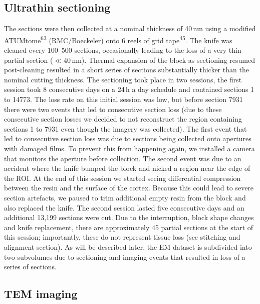 \documentclass{article}
\begin{document}
\subsection*{Ultrathin sectioning}

The sections were then collected at a nominal thickness of 40\,nm using a modified ATUMtome\textsuperscript{63} (RMC/Boeckeler) onto 6 reels of grid tape\textsuperscript{45}. The knife was cleaned every 100–500 sections, occasionally leading to the loss of a very thin partial section ($\ll$40\,nm). Thermal expansion of the block as sectioning resumed post-cleaning resulted in a short series of sections substantially thicker than the nominal cutting thickness. The sectioning took place in two sessions, the first session took 8 consecutive days on a 24\,h a day schedule and contained sections 1 to 14773. The loss rate on this initial session was low, but before section 7931 there were two events that led to consecutive section loss (due to these consecutive section losses we decided to not reconstruct the region containing sections 1 to 7931 even though the imagery was collected). The first event that led to consecutive section loss was due to sections being collected onto apertures with damaged films. To prevent this from happening again, we installed a camera that monitors the aperture before collection. The second event was due to an accident where the knife bumped the block and nicked a region near the edge of the ROI. At the end of this session we started seeing differential compression between the resin and the surface of the cortex. Because this could lead to severe section artefacts, we paused to trim additional empty resin from the block and also replaced the knife. The second session lasted five consecutive days and an additional 13,199 sections were cut. Due to the interruption, block shape changes and knife replacement, there are approximately 45 partial sections at the start of this session; importantly, these do not represent tissue loss (see stitching and alignment section). As will be described later, the EM dataset is subdivided into two subvolumes due to sectioning and imaging events that resulted in loss of a series of sections.

\subsection*{TEM imaging}
\end{document}
